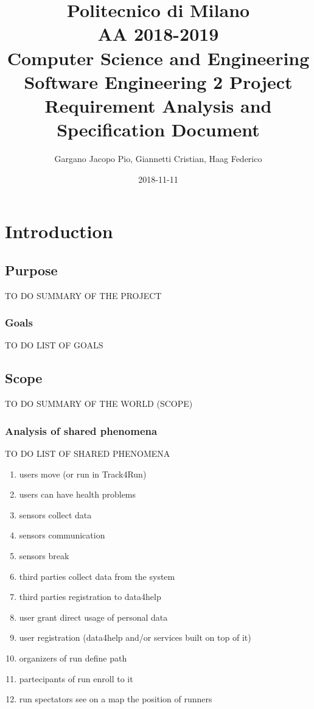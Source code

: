 \documentclass{report}
\title{
\small Politecnico di Milano\\
\small AA 2018-2019\\
\large Computer Science and Engineering\\
\Large Software Engineering 2 Project\\
\huge Requirement Analysis and Specification Document
}
\date{2018-11-11}
\author{
\large Gargano Jacopo Pio, Giannetti Cristian, Haag Federico}
\begin{document}
	\maketitle
	
	\newpage
	\tableofcontents
	
	\newpage
	\chapter{Introduction}
		\section{Purpose}
			TO DO SUMMARY OF THE PROJECT
			\subsection{Goals}
			TO DO LIST OF GOALS
		\section{Scope}
			TO DO SUMMARY OF THE WORLD (SCOPE)
			\subsection{Analysis of shared phenomena}
			TO DO LIST OF SHARED PHENOMENA
			
		\begin{enumerate}
		\item users move (or run in Track4Run)
		\item users can have health problems
		\item sensors collect data
		\item sensors communication
		\item sensors break
		\item third parties collect data from the system
		\item third parties registration to data4help
		\item user grant direct usage of personal data
		\item user registration (data4help and/or services built on top of it)
		\item organizers of run define path
		\item partecipants of run enroll to it
		\item run spectators see on a map the position of runners
		
		\end{enumerate}
\end{document}
